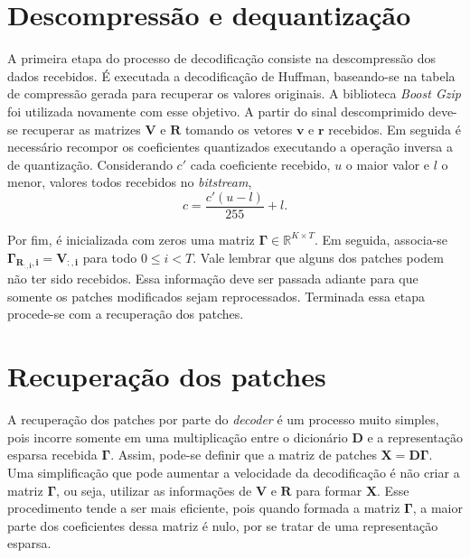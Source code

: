 \documentclass[cic,tc]{iiufrgs}
\renewcommand{\vec}[1]{\bm{#1}}
\newcommand{\mat}[1]{\bm{#1}}
\begin{document}

\section{Descompressão e dequantização}
\label{sec:decdeq}

A primeira etapa do processo de decodificação consiste na descompressão dos dados recebidos. 
É executada a decodificação de Huffman, 
baseando-se na tabela de compressão gerada para recuperar os valores originais.
A biblioteca \textit{Boost Gzip} \cite{Boost} foi utilizada novamente com esse objetivo.
A partir do sinal descomprimido deve-se recuperar as matrizes $\mat{V}$ e $\mat{R}$
tomando os vetores $\vec{v}$ e $\vec{r}$ recebidos.
Em seguida é necessário recompor os coeficientes quantizados 
executando a operação inversa a de quantização.
Considerando $c'$ cada coeficiente recebido, $u$ o maior valor e $l$ o menor, 
valores todos recebidos no \textit{bitstream},
\begin{equation*}
    c = \frac{c' (u - l)}{255} + l.
\end{equation*}

Por fim, é inicializada com zeros uma matriz $\mat{\Gamma} \in \mathbb{R}^{K \times T}$.
Em seguida, associa-se $\mat{\Gamma_{\mat{R_{:,i}}, i}} = \mat{V_{:,i}}$ para todo $0 \le i < T$.
Vale lembrar que alguns dos patches podem não ter sido recebidos. 
Essa informação deve ser passada adiante para que somente os patches modificados
sejam reprocessados.
Terminada essa etapa procede-se com a recuperação dos patches.

\section{Recuperação dos patches}
A recuperação dos patches por parte do \textit{decoder} é um processo muito simples,
pois incorre somente em uma multiplicação entre o dicionário $\mat{D}$ e a 
representação esparsa recebida $\mat{\Gamma}$.
Assim, pode-se definir que a matriz de patches $\mat{X} = \mat{D} \mat{\Gamma}$.
Uma simplificação que pode aumentar a velocidade da decodificação é não criar a matriz $\mat{\Gamma}$,
ou seja, utilizar as informações de $\mat{V}$ e $\mat{R}$ para formar $\mat{X}$. 
Esse procedimento tende a ser mais eficiente, pois quando formada a matriz $\mat{\Gamma}$, 
a maior parte dos coeficientes dessa matriz é nulo, por se tratar de uma representação esparsa.
\end{document}
